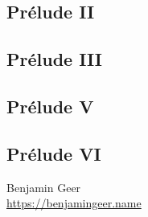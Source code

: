 \documentclass[a4paper, 12pt]{book}
\begin{document}
    

    \subsection*{Prélude II}

    
    
    \subsection*{Prélude III}

    



    \subsection*{Prélude V}

    

    \subsection*{Prélude VI}

    

\raggedbottom

\vspace{\baselineskip}

\hfill
\begin{minipage}[t]{0.55\textwidth}
  Benjamin Geer \\
  \url{https://benjamingeer.name}
\end{minipage}

\pagebreak
\cleardoublepage
\mainmatter


        
        
        
        
        
\end{document}

